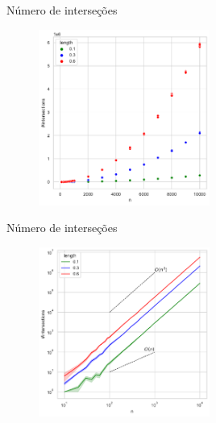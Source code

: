 \documentclass[aspectratio=169,usenames,dvipsnames]{beamer}
\begin{document}
\begin{frame}{Número de interseções}
  \begin{figure}
    \includegraphics[width=0.5\textwidth]{figs/exemplos/n_intersections.pdf}
  \end{figure}
\end{frame}

\begin{frame}{Número de interseções}
  \begin{figure}
    \includegraphics[width=0.5\textwidth]{figs/exemplos/n_intersections_log.pdf}
  \end{figure}
\end{frame}
\end{document}
